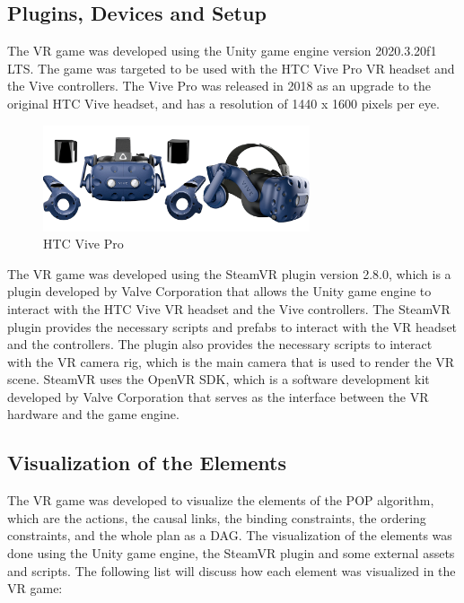 \subsection{Plugins, Devices and Setup} \label{subsec:plugins_devices_setup}
The \ac{VR} game was developed using the Unity game engine version 2020.3.20f1 \ac{LTS}. The game was targeted to be used with the HTC Vive Pro \ac{VR} headset and the Vive controllers. The Vive Pro was released in 2018 as an upgrade to the original HTC Vive headset, and has a resolution of 1440 x 1600 pixels per eye\cite{WikiHTCVive}.

\begin{figure}[H]
    \centering
    \includegraphics[width=0.7\textwidth]{images/htc_vive_pro_full.PNG}
    \caption[HTC Vive Pro]{HTC Vive Pro \cite{ViveProFullKit}}
    \label{fig:htc_vive_pro}
\end{figure}

The \ac{VR} game was developed using the SteamVR plugin version 2.8.0, which is a plugin developed by Valve Corporation that allows the Unity game engine to interact with the HTC Vive \ac{VR} headset and the Vive controllers. The SteamVR plugin provides the necessary scripts and prefabs to interact with the \ac{VR} headset and the controllers. The plugin also provides the necessary scripts to interact with the \ac{VR} camera rig, which is the main camera that is used to render the \ac{VR} scene. SteamVR uses the OpenVR SDK, which is a software development kit developed by Valve Corporation that serves as the interface between the \ac{VR} hardware and the game engine\cite{WikiOpenVR}.


\subsection{Visualization of the Elements} \label{subsec:visualization_elements}

The \ac{VR} game was developed to visualize the elements of the \ac{POP} algorithm, which are the actions, the causal links, the binding constraints, the ordering constraints, and the whole plan as a \acf{DAG}. The visualization of the elements was done using the Unity game engine, the SteamVR plugin and some external assets and scripts. The following list will discuss how each element was visualized in the \ac{VR} game:

